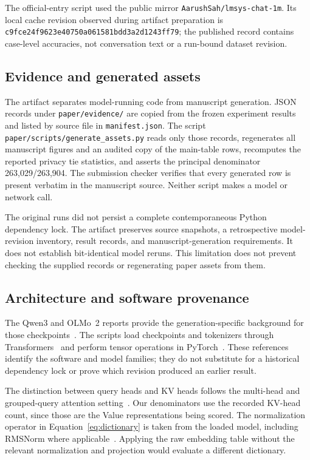 The official-entry script used the public mirror \texttt{AarushSah/lmsys-chat-1m}. Its local cache revision observed during artifact preparation is \texttt{c9fce24f9623e40750a061581bdd3a2d1243ff79}; the published record contains case-level accuracies, not conversation text or a run-bound dataset revision.

\subsection{Evidence and generated assets}
The artifact separates model-running code from manuscript generation. JSON records under \texttt{paper/evidence/} are copied from the frozen experiment results and listed by source file in \texttt{manifest.json}. The script \texttt{paper/scripts/generate\_assets.py} reads only those records, regenerates all manuscript figures and an audited copy of the main-table rows, recomputes the reported privacy tie statistics, and asserts the principal denominator 263,029/263,904. The submission checker verifies that every generated row is present verbatim in the manuscript source. Neither script makes a model or network call.

The original runs did not persist a complete contemporaneous Python dependency lock. The artifact preserves source snapshots, a retrospective model-revision inventory, result records, and manuscript-generation requirements. It does not establish bit-identical model reruns. This limitation does not prevent checking the supplied records or regenerating paper assets from them.

\subsection{Architecture and software provenance}
The Qwen3 and OLMo~2 reports provide the generation-specific background for those checkpoints~\cite{qwen3,olmo2}. The scripts load checkpoints and tokenizers through Transformers~\cite{transformers} and perform tensor operations in PyTorch~\cite{pytorch}. These references identify the software and model families; they do not substitute for a historical dependency lock or prove which revision produced an earlier result.

The distinction between query heads and KV heads follows the multi-head and grouped-query attention setting~\cite{attention,gqa}. Our denominators use the recorded KV-head count, since those are the Value representations being scored. The normalization operator in Equation~\eqref{eq:dictionary} is taken from the loaded model, including RMSNorm where applicable~\cite{rmsnorm}. Applying the raw embedding table without the relevant normalization and projection would evaluate a different dictionary.

